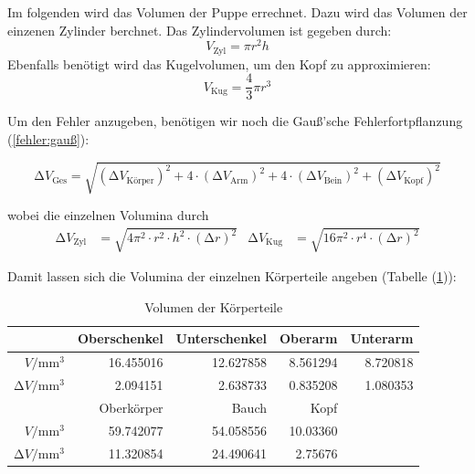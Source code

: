 Im folgenden wird das Volumen der Puppe errechnet.
Dazu wird das Volumen der einzenen Zylinder berchnet.
Das Zylindervolumen ist gegeben durch:
\begin{equation*}
  V_{\text{Zyl}} = \pi r^2 h
\end{equation*}
Ebenfalls benötigt wird das Kugelvolumen, um den Kopf zu approximieren:
\begin{equation*}
  V_{\text{Kug}} = \frac{4}{3} \pi r^3
\end{equation*}

Um den Fehler anzugeben, benötigen wir noch die Gauß'sche Fehlerfortpflanzung (\ref{fehler:gauß}):

\begin{equation}
  \increment V_{\text{Ges}} = \sqrt{(\increment V_{\text{Körper}})^2 + 4 \cdot (\increment V_{\text{Arm}})^2 
    + 4 \cdot (\increment V_{\text{Bein}})^2 + (\increment V_{\text{Kopf}})^2}
\end{equation}

wobei die einzelnen Volumina durch 
\begin{align*}
  \increment V_{\text{Zyl}} &= \sqrt{4 \pi^2 \cdot r^2 \cdot h^2 \cdot (\increment r)^2} & 
  \increment V_{\text{Kug}} &= \sqrt{16 \pi^2 \cdot r^4 \cdot (\increment r)^2}
\end{align*}

Damit lassen sich die Volumina der einzelnen Körperteile angeben (Tabelle (\ref{tab:VolGlieder})):

\begin{table}[H]
  \centering
  \caption{Volumen der Körperteile}
  \label{tab:VolGlieder}
  \begin{tabular}{rrrrr}
    \toprule
    & Oberschenkel &     Unterschenkel &     Oberarm &     Unterarm \\
    \midrule
    $V / \unit{\milli\cubic\meter}$  & 16.455016 & 12.627858 & 8.561294 & 8.720818 \\
    $\increment V / \unit{\milli\cubic\meter}$  &   2.094151 &  2.638733 & 0.835208 & 1.080353  \\
    \midrule
    &    Oberkörper &     Bauch & Kopf & \\
    \midrule
    $V / \unit{\milli\cubic\meter}$  & 59.742077 & 54.058556 & 10.03360 & \\ 
    $\increment V / \unit{\milli\cubic\meter}$  &  11.320854 & 24.490641 & 2.75676 & \\
    \bottomrule
    \end{tabular}
\end{table}


